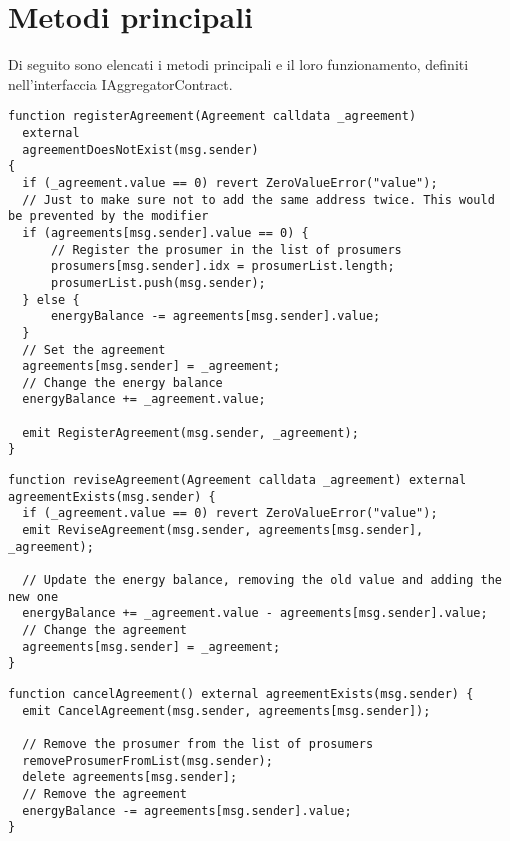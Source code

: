 \section{Metodi principali}

Di seguito sono elencati i metodi principali e il loro funzionamento, definiti nell'interfaccia IAggregatorContract.

\begin{verbatim}
function registerAgreement(Agreement calldata _agreement)
  external
  agreementDoesNotExist(msg.sender)
{
  if (_agreement.value == 0) revert ZeroValueError("value");
  // Just to make sure not to add the same address twice. This would be prevented by the modifier
  if (agreements[msg.sender].value == 0) {
      // Register the prosumer in the list of prosumers
      prosumers[msg.sender].idx = prosumerList.length;
      prosumerList.push(msg.sender);
  } else {
      energyBalance -= agreements[msg.sender].value;
  }
  // Set the agreement
  agreements[msg.sender] = _agreement;
  // Change the energy balance
  energyBalance += _agreement.value;

  emit RegisterAgreement(msg.sender, _agreement);
}
\end{verbatim}

\begin{verbatim}
function reviseAgreement(Agreement calldata _agreement) external agreementExists(msg.sender) {
  if (_agreement.value == 0) revert ZeroValueError("value");
  emit ReviseAgreement(msg.sender, agreements[msg.sender], _agreement);

  // Update the energy balance, removing the old value and adding the new one
  energyBalance += _agreement.value - agreements[msg.sender].value;
  // Change the agreement 
  agreements[msg.sender] = _agreement;
}
\end{verbatim}

\begin{verbatim}
function cancelAgreement() external agreementExists(msg.sender) {
  emit CancelAgreement(msg.sender, agreements[msg.sender]);

  // Remove the prosumer from the list of prosumers
  removeProsumerFromList(msg.sender);
  delete agreements[msg.sender];
  // Remove the agreement
  energyBalance -= agreements[msg.sender].value;
}
\end{verbatim}

